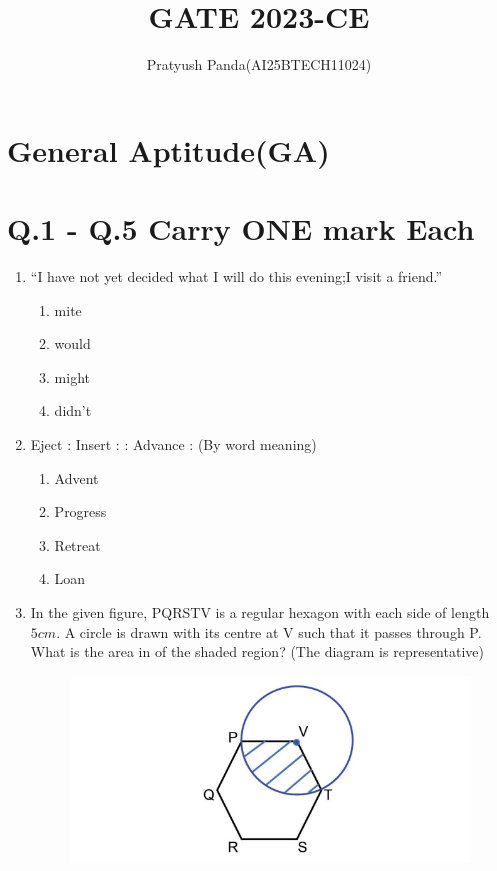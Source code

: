 \documentclass[journal,12pt,onecolumn]{IEEEtran}
\theoremstyle{remark}
\begin{document}
\title{GATE 2023-CE}
\author{Pratyush Panda(AI25BTECH11024)}
\maketitle

\renewcommand{\thefigure}{\theenumi}
\renewcommand{\thetable}{\theenumi}

\section*{General Aptitude(GA)}
\section*{Q.1 - Q.5 Carry ONE mark Each}

\begin{enumerate}
\item “I have not yet decided what I will do this evening;I \underline{\hspace{2cm}} visit a friend.”

\hfill{}
\begin{enumerate}
\item mite
\item would
\item might
\item didn't
\end{enumerate}

\item Eject : Insert : : Advance : \underline{\hspace{2cm}}
(By word meaning)

\hfill{}
\begin{enumerate}
\item Advent
\item Progress
\item Retreat
\item Loan
\end{enumerate}

\item In the given figure, PQRSTV is a regular hexagon with each side of length $5 cm$. A
circle is drawn with its centre at V such that it passes through P. What is the area in  of the shaded region? (The diagram is representative)

\hfill{}
\begin{figure}[H]
\centering
\includegraphics[width = 0.5\columnwidth]{figs/q3.png}
\caption*{}
\label{fig:Q.3}
\end{figure}


\end{enumerate}
\end{document}
